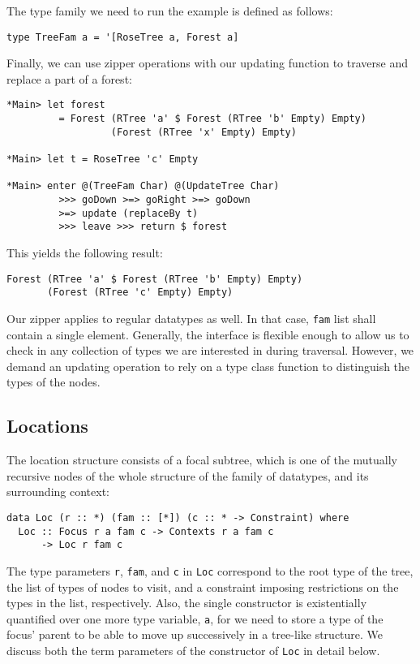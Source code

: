 \documentclass[runningheads]{llncs}
\newcommand{\K}[1]{\lstinline[style=fancy]{#1}}
\begin{document}
The type family we need to run the example is defined as follows:
\begin{lstlisting}[style=fancy]
type TreeFam a = '[RoseTree a, Forest a]
\end{lstlisting}

Finally, we can use zipper operations with our updating function to traverse and replace a part of a forest:
\begin{lstlisting}[style=ttstyle]
*Main> let forest
         = Forest (RTree 'a' $ Forest (RTree 'b' Empty) Empty)
                  (Forest (RTree 'x' Empty) Empty)

*Main> let t = RoseTree 'c' Empty

*Main> enter @(TreeFam Char) @(UpdateTree Char)
         >>> goDown >=> goRight >=> goDown
         >=> update (replaceBy t)
         >>> leave >>> return $ forest
\end{lstlisting}
This yields the following result:
\begin{lstlisting}[style=fancy]
Forest (RTree 'a' $ Forest (RTree 'b' Empty) Empty)
       (Forest (RTree 'c' Empty) Empty)
\end{lstlisting}

Our zipper applies to regular datatypes as well. In that case, \K{fam} list shall contain a single element. Generally, the interface is flexible enough to allow us to check in any collection of types we are interested in during traversal. However, we demand an updating operation to rely on a type class function to distinguish the types of the nodes.

\subsection{Locations}
\label{ss:locs}

The location structure consists of a focal subtree, which is one of the mutually recursive nodes of the whole structure of the family of datatypes, and its surrounding context:
\begin{lstlisting}[style=fancy]
data Loc (r :: *) (fam :: [*]) (c :: * -> Constraint) where
  Loc :: Focus r a fam c -> Contexts r a fam c
      -> Loc r fam c
\end{lstlisting}
The type parameters \K{r}, \K{fam}, and \K{c} in \K{Loc} correspond to the root type of the tree, the list of types of nodes to visit, and a constraint imposing restrictions on the types in the list, respectively. Also, the single constructor is existentially quantified over one more type variable, \K{a}, for we need to store a type of the focus' parent to be able to move up successively in a tree-like structure. We discuss both the term parameters of the constructor of \K{Loc} in detail below. 
\end{document}
